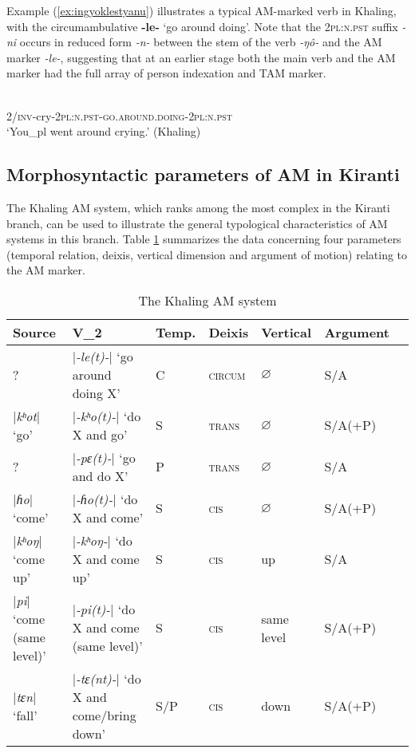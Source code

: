 \documentclass[oneside,a4paper,11pt]{article}
\newcommand{\ipa}[1]{{\phon\textit{#1}}}
\newcommand{\rouge}[1]{{\color{red}#1}}
\newcommand{\dhatu}[2]{|\ipa{#1}| `#2'}
\begin{document}
Example (\ref{ex:ingyoklestyanu}) illustrates a typical AM-marked verb in Khaling, with the circumambulative \textbf{-le-} `go around doing'. Note that the \textsc{2pl:n.pst} suffix \ipa{-ni} occurs in reduced form \ipa{-n-} between the stem of the verb \ipa{-ŋô-} and  the AM marker \ipa{-le-}, suggesting that at an earlier stage both the main verb and the AM marker had the full array of person indexation and TAM marker.

\begin{exe}
\ex \label{ex:ingyoklestyanu}
\gll \ipa{ʔi-ŋô-n-\rouge{le}-ni} \\
2/\textsc{inv}-cry-\textsc{2pl:n.pst}-\textsc{\rouge{go.around.doing}}-\textsc{2pl:n.pst} \\
\glt `You_{pl} went around crying.'  (Khaling)
\end{exe}


\subsection{Morphosyntactic parameters of AM in Kiranti}
The Khaling AM system, which ranks among the most complex in the Kiranti branch, can be used to illustrate the general typological characteristics of AM systems in this branch. Table \ref{tab:system} summarizes the data concerning four parameters (temporal relation, deixis, vertical dimension and argument of motion) relating to the AM marker.

\begin{landscape}
\begin{table}%
\caption{The Khaling AM system} \label{tab:system} \centering
\begin{tabular}{lllllll}
\toprule
Source &V_2 & Temp.& Deixis & Vertical  & Argument \\
\midrule
?& \dhatu{-le(t)-}{go around doing X} &C& \textsc{circum} & $\varnothing$ & S/A \\
\dhatu{kʰot}{go} &\dhatu{-kʰo(t)-}{do X and go} &S& \textsc{trans} & $\varnothing$ &  S/A(+P) \\
?&\dhatu{-pɛ(t)-}{go and do X} &P& \textsc{trans} & $\varnothing$ & S/A \\
\dhatu{ɦo}{come} &\dhatu{-ɦo(t)-}{do X and come} &S& \textsc{cis} & $\varnothing$ & S/A(+P) \\
\dhatu{kʰoŋ}{come up}&\dhatu{-kʰoŋ-}{do X and come up} &S& \textsc{cis} &up & S/A \\
 \dhatu{pi}{come (same level)}&\dhatu{-pi(t)-}{do X and come (same level)} &S& \textsc{cis} &same level & S/A(+P) \\
\dhatu{tɛn}{fall} & \dhatu{-tɛ(nt)-}{do X and come/bring down} &S/P & \textsc{cis} &down & S/A(+P) \\
\bottomrule
\end{tabular}
\end{table}
\end{landscape}
\end{document}
